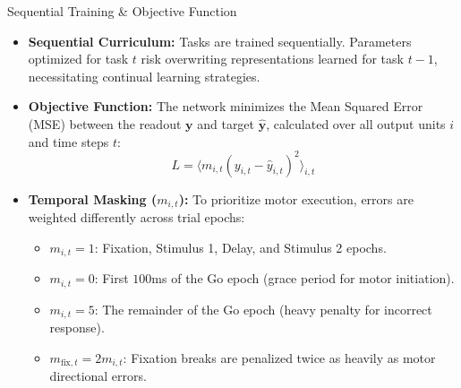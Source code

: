 \documentclass[aspectratio=169,xcolor=dvipsnames]{beamer}
\begin{document}

\begin{frame}{Sequential Training \& Objective Function}
	\footnotesize
	\begin{itemize}
		\item \textbf{Sequential Curriculum:}
		Tasks are trained sequentially. Parameters optimized for task $t$ risk overwriting representations learned for task $t-1$, necessitating continual learning strategies.
		
		\item \textbf{Objective Function:}
		The network minimizes the Mean Squared Error (MSE) between the readout $\mathbf{y}$ and target $\hat{\mathbf{y}}$, calculated over all output units $i$ and time steps $t$:
		$$L = \langle m_{i,t}(y_{i,t} - \hat{y}_{i,t})^2 \rangle_{i,t}$$
		
		\item \textbf{Temporal Masking ($m_{i,t}$):}
		To prioritize motor execution, errors are weighted differently across trial epochs:
		\begin{itemize}
			\item $m_{i,t} = 1$: Fixation, Stimulus 1, Delay, and Stimulus 2 epochs.
			\item $m_{i,t} = 0$: First $100$ms of the Go epoch (grace period for motor initiation).
			\item $m_{i,t} = 5$: The remainder of the Go epoch (heavy penalty for incorrect response).
			\item $m_{\text{fix},t} = 2 m_{i,t}$: Fixation breaks are penalized twice as heavily as motor directional errors.
		\end{itemize}
	\end{itemize}
\end{frame}

\end{document}
